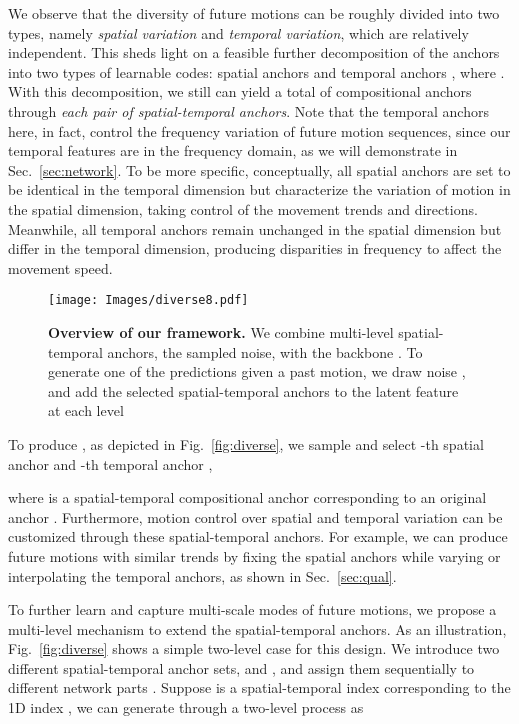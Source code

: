 \label{sec:mmst} We observe that the diversity of future motions can be roughly divided into two types, namely {\em{spatial variation}} and {\em{temporal variation}}, which are relatively independent. This sheds light on a feasible further decomposition of the  anchors into two types of learnable codes: spatial anchors  and temporal anchors , where . 
With this decomposition, we still can yield a total of  compositional anchors through \textit{each pair of spatial-temporal anchors}.
Note that the temporal anchors here, in fact, control the frequency variation of future motion sequences, since our temporal features are in the frequency domain, as we will demonstrate in Sec.~\ref{sec:network}. 
To be more specific, conceptually, all spatial anchors are set to be identical in the temporal dimension but characterize the variation of motion in the spatial dimension, taking control of the movement trends and directions. Meanwhile, all temporal anchors remain unchanged in the spatial dimension but differ in the temporal dimension, producing disparities in frequency to affect the movement speed. 

\begin{figure}[t]
\centering
\texttt{[image: Images/diverse8.pdf]}
\caption{\textbf{Overview of our \ours{} framework.} We combine multi-level spatial-temporal anchors, the sampled noise, with the backbone \oursmodel. To generate one of the predictions given a past motion, we draw noise , and add the selected spatial-temporal anchors to the latent feature at each level}
\label{fig:deterministic2}
\end{figure}

To produce , as depicted in Fig.~\ref{fig:diverse}{\color{red}{(c)}}, we sample  and select -th spatial anchor  and -th temporal anchor , 

where  is a spatial-temporal compositional anchor corresponding to an original anchor . Furthermore, motion control over spatial and temporal variation can be customized through these spatial-temporal anchors. For example, we can produce future motions with similar trends by fixing the spatial anchors while varying or interpolating the temporal anchors, as shown in Sec.~\ref{sec:qual}. 

To further learn and capture multi-scale modes of future motions, we propose a multi-level mechanism to extend the spatial-temporal anchors.
As an illustration, Fig.~\ref{fig:diverse}{\color{red}{(d)}} shows a simple two-level case for this design. We introduce two different spatial-temporal anchor sets,  and , and assign them sequentially to different network parts . Suppose  is a spatial-temporal index corresponding to the 1D index , we can generate  through a two-level process as

